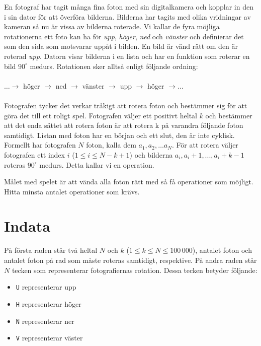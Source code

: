 En fotograf har tagit många fina foton med sin digitalkamera och kopplar in den
i sin dator för att överföra bilderna. Bilderna har tagits med olika vridningar
av kameran så nu är vissa av bilderna roterade. Vi kallar de fyra möjliga
rotationerna ett foto kan ha för \emph{upp}, \emph{höger}, \emph{ned} och \emph{vänster} och
definierar det som den sida som motsvarar uppåt i bilden. En bild är vänd rätt
om den är roterad \emph{upp}. Datorn visar bilderna i en lista och har en funktion
som roterar en bild $90^\circ$ medurs. Rotationen sker alltså enligt följande ordning:
\\
\\
$\dots \rightarrow$ höger $\rightarrow$ ned $\rightarrow$ vänster $\rightarrow$
upp $\rightarrow$ höger $\rightarrow \dots$
\\
\\
Fotografen tycker det verkar tråkigt att rotera foton och bestämmer sig för att
göra det till ett roligt spel. Fotografen väljer ett positivt heltal $k$ och
bestämmer att det enda sättet att rotera foton är att rotera k på varandra
följande foton samtidigt. Listan med foton har en början och ett slut, den är
inte cyklisk. Formellt har fotografen $N$ foton, kalla dem $a_1, a_2, \dots
a_N$. För att rotera väljer fotografen ett index $i$ ($1 \leq i \leq N-k+1$)
och bilderna $a_i, a_i+1, ... , a_i+k-1$ roteras $90^\circ$ medurs. Detta kallar vi en
operation.

Målet med spelet är att vända alla foton rätt med så få operationer som
möjligt. Hitta minsta antalet operationer som krävs.

\section*{Indata}
På första raden står två heltal $N$ och $k$ ($1 \leq k \leq N \leq 100\,000$),
antalet foton och antalet foton på rad som måste roteras samtidigt, respektive.
På andra raden står $N$ tecken som representerar fotografiernas rotation. Dessa
tecken betyder följande:

\begin{itemize}
\item \texttt{U} representerar upp
\item \texttt{H} representerar höger
\item \texttt{N} representerar ner
\item \texttt{V} representerar väster
\end{itemize}

